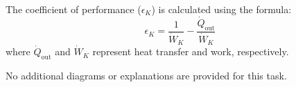 The coefficient of performance (\( \epsilon_K \)) is calculated using the formula:  
\[
\epsilon_K = \frac{1}{\dot{W}_K} - \frac{\dot{Q}_{\text{out}}}{\dot{W}_K}  
\]  
where \( \dot{Q}_{\text{out}} \) and \( \dot{W}_K \) represent heat transfer and work, respectively.  

No additional diagrams or explanations are provided for this task.